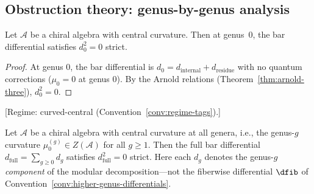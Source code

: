 \label{def:maurer-cartan}%
\label{eq:mc-equation}%
\label{thm:mc-deformations}%
\label{thm:mc-periods}%

\subsection{Obstruction theory: genus-by-genus analysis}

\begin{theorem}\label{thm:genus-zero-strict}
Let $\mathcal{A}$ be a chiral algebra with central curvature. Then at genus~$0$,
the bar differential satisfies $d_0^2 = 0$ strict.
\end{theorem}

\begin{proof}
At genus 0, the bar differential is
$d_0 = d_{\text{internal}} + d_{\text{residue}}$
with no quantum corrections ($\mu_0 = 0$ at genus 0).
By the Arnold relations (Theorem~\ref{thm:arnold-three}), $d_0^2 = 0$.
\end{proof}

\begin{theorem}\label{thm:genus-induction-strict}
\textup{[Regime: curved-central\linebreak
\textup{(}Convention~\textup{\ref{conv:regime-tags})}.]}

Let $\mathcal{A}$ be a chiral algebra with central curvature at all genera,
i.e., the genus-$g$ curvature $\mu_0^{(g)} \in Z(\mathcal{A})$ for all $g \geq 1$.
Then the full bar differential $d_{\mathrm{full}} = \sum_{g \geq 0} d_g$ satisfies
$d_{\mathrm{full}}^2 = 0$ strict.
Here each $d_g$ denotes the genus-$g$ \emph{component} of the modular
decomposition---not the fiberwise differential $\dfib$ of
Convention~\textup{\ref{conv:higher-genus-differentials}}.
\end{theorem}

